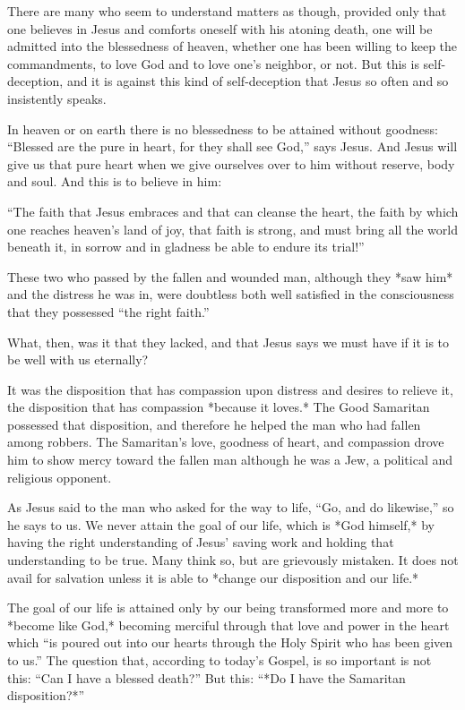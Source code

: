 There are many who seem to understand matters as though, provided only that one believes in Jesus and comforts oneself with his atoning death, one will be admitted into the blessedness of heaven, whether one has been willing to keep the commandments, to love God and to love one’s neighbor, or not. But this is self-deception, and it is against this kind of self-deception that Jesus so often and so insistently speaks.

In heaven or on earth there is no blessedness to be attained without goodness: “Blessed are the pure in heart, for they shall see God,” says Jesus. And Jesus will give us that pure heart when we give ourselves over to him without reserve, body and soul. And this is to believe in him:

“The faith that Jesus embraces
and that can cleanse the heart,
the faith by which one reaches
heaven’s land of joy,
that faith is strong, and must
bring all the world beneath it,
in sorrow and in gladness
be able to endure its trial!”

These two who passed by the fallen and wounded man, although they *saw him* and the distress he was in, were doubtless both well satisfied in the consciousness that they possessed “the right faith.”

What, then, was it that they lacked, and that Jesus says we must have if it is to be well with us eternally?

It was the disposition that has compassion upon distress and desires to relieve it, the disposition that has compassion *because it loves.* The Good Samaritan possessed that disposition, and therefore he helped the man who had fallen among robbers. The Samaritan’s love, goodness of heart, and compassion drove him to show mercy toward the fallen man although he was a Jew, a political and religious opponent.

As Jesus said to the man who asked for the way to life, “Go, and do likewise,” so he says to us. We never attain the goal of our life, which is *God himself,* by having the right understanding of Jesus’ saving work and holding that understanding to be true. Many think so, but are grievously mistaken. It does not avail for salvation unless it is able to *change our disposition and our life.*

The goal of our life is attained only by our being transformed more and more to *become like God,* becoming merciful through that love and power in the heart which “is poured out into our hearts through the Holy Spirit who has been given to us.” The question that, according to today’s Gospel, is so important is not this: “Can I have a blessed death?” But this: “*Do I have the Samaritan disposition?*”

